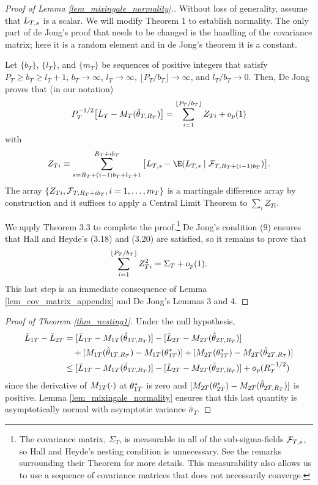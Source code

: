 \documentclass[11pt]{article} \def\baselinestretch{1.08}
\begin{document}
\begin{proof}[Proof of Lemma \ref{lem_mixingale_normality}.]
\renewcommand{\insum}{\sum_{s=R_T + (i-1)b_T + l_T + 1}^{R_T + i b_T}}
Without loss of generality, assume that $L_{{}T,{s}}$ is a scalar. 
We will modify  Theorem 1 to
establish normality. The only part of de Jong's proof that needs to be
changed is the handling of the covariance matrix; here it is a random
element and in de Jong's theorem it is a constant.

Let $\{b_T\}$, $\{l_T\}$, and $\{m_T\}$ be sequences of positive
integers that satisfy $P_T \geq b_T \geq l_T+1$, $b_T \to \infty$,
$l_T \to \infty$, $\lfloor P_T/b_T \rfloor \to \infty$, and
$l_T/b_T \to 0$. Then, De Jong proves that (in our notation)
\[
P_T^{-1/2} \big[\bar L_{{}T} - M_{{}T}({\hat \theta_{{}T,{R_T}}})\big] = \sum_{i=1}^{\lfloor P_T/b_T \rfloor} Z_{Ti} + o_p(1)
\]
with 
\[
Z_{Ti} \equiv \insum \big[\fT{}{s} - \E(\fT{}{s} \mid \FT{R_T + (i-1)b_T})\big].
\]
The array $\{Z_{Ti}, \mathcal F_{T,{R_T + ib_T}}, i = 1,\dotsc,m_T\}$ is a martingale 
difference array by construction and it suffices to apply a Central
Limit Theorem to $\sum_i Z_{Ti}$.

We apply  Theorem 3.3 to complete
the proof.\footnote{The covariance matrix, $\Sigma_T$, is measurable
  in all of the sub-sigma-fields $\mathcal F_{T,{s}}$, so Hall and Heyde's nesting
condition is unnecessary.  See the remarks surrounding their Theorem
for more details.  This measurability also allows us to use a sequence
of covariance matrices that does not necessarily converge.}  De Jong's
condition (9) ensures that Hall and Heyde's (3.18) and (3.20) are
satisfied, so it remains to prove that 
\[
  \sum_{i=1}^{\lfloor P_T/b_T \rfloor} Z_{Ti}^2 = \Sigma_T + o_p(1).
\]
This last step is an immediate consequence of Lemma
 \ref{lem_cov_matrix_appendix} and De Jong's Lemmas 3 and 4.
\end{proof}

\begin{proof}[Proof of Theorem \ref{thm_nesting1}]
Under the null hypothesis,
\begin{align*}
  \bar L_{{1}T} - \bar L_{{2}T} &= [\bar L_{{1}T} - M_{{1}T}({\hat \theta_{{1}T,{R_T}}})] - [\bar L_{{2}T} - M_{{2}T}({\hat \theta_{{2}T,{R_T}}})]
  \\ &\quad + [M_{{1}T}({\hat \theta_{{1}T,{R_T}}}) - M_{{1}T}({\theta^*_{{1}T}})] + [M_{{2}T}({\theta^*_{{2}T}}) - M_{{2}T}({\hat \theta_{{2}T,{R_T}}})] \\
  & \leq [\bar L_{{1}T} - M_{{1}T}({\hat \theta_{{1}T,{R_T}}})] - [\bar L_{{2}T} - M_{{2}T}({\hat \theta_{{2}T,{R_T}}})] + o_p(R_T^{-1/2})
\end{align*}
since the derivative of $M_{{1}T}({\cdot})$ at $\theta^*_{{1}T}$ is zero and
$[M_{{2}T}({\theta^*_{{2}T}}) - M_{{2}T}({\hat \theta_{{2}T,{R_T}}})]$ is positive.  Lemma
\ref{lem_mixingale_normality} ensures that this last quantity is
asymptotically normal with asymptotic variance $\hat \sigma_T$.
\end{proof}
\end{document}
